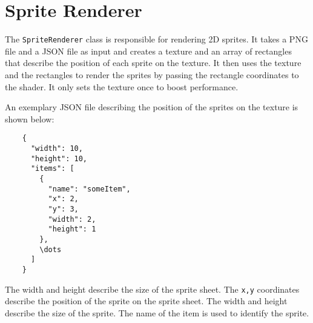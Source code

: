 \section{Sprite Renderer}\label{sprite_renderer}
The \texttt{SpriteRenderer} class is responsible for rendering 2D sprites.
It takes a PNG file and a JSON file as input and creates a texture and an array of rectangles that describe the position of each sprite on the texture.
It then uses the texture and the rectangles to render the sprites by passing the rectangle coordinates to the shader.
It only sets the texture once to boost performance.

An exemplary JSON file describing the position of the sprites on the texture is shown below:

\begin{verbatim}
    {
      "width": 10,
      "height": 10,
      "items": [
        {
          "name": "someItem",
          "x": 2,
          "y": 3,
          "width": 2,
          "height": 1
        },
        \dots
      ]
    }
\end{verbatim}


The width and height describe the size of the sprite sheet.
The \texttt{x,y} coordinates describe the position of the sprite on the sprite sheet.
The width and height describe the size of the sprite.
The name of the item is used to identify the sprite.

